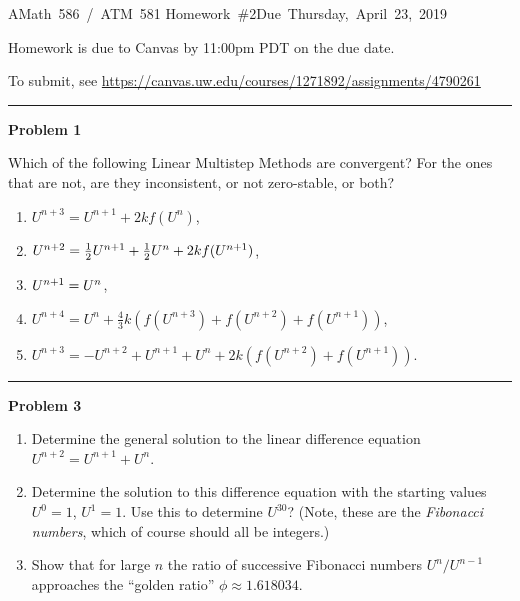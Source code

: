\documentclass[10pt]{article}
\begin{document}
\hfill\vbox{\hbox{AMath 586 / ATM 581}
\hbox{Homework \#2}\hbox{Due Thursday, April 23, 2019}}

\vskip 5pt

Homework is due to Canvas by 11:00pm PDT on the due date.

To submit, see
\url{https://canvas.uw.edu/courses/1271892/assignments/4790261}



\vskip 1cm
\hrule
{\bf Problem 1}

Which of the following Linear Multistep Methods are convergent?  For 
the ones that are not, are they inconsistent, or not zero-stable, or both?
 \begin{enumerate}
 \item $U^{n+3} = U^{n+1} + 2kf(U^n)$,
 \item $U^{n+2} = \frac{1}{2} U^{n+1} + \frac{1}{2} U^{n} + 2kf(U^{n+1})$,
 \item $U^{n+1} = U^n$, 
 \item $U^{n+4} = U^{n} + \frac 4 3 k(f(U^{n+3})+f(U^{n+2})+f(U^{n+1}))$,
 \item $U^{n+3} = -U^{n+2} + U^{n+1} +U^{n}+2k(f(U^{n+2})+f(U^{n+1}))$.
 \end{enumerate}






\vskip 1cm
\hrule
{\bf Problem 3}

\begin{enumerate}
\item Determine the general solution to the linear difference equation
$U^{n+2} = U^{n+1} + U^n$.

\item Determine the solution to this difference equation with the starting
values $U^0=1$, $U^1=1$.  Use this to determine $U^{30}$?  
(Note, these are the {\em Fibonacci numbers}, which of course should all be
integers.)

\item Show that for large $n$ the ratio of successive Fibonacci numbers
$U^n/U^{n-1}$ approaches the ``golden ratio'' $\phi \approx 1.618034$.
\end{enumerate} 
\end{document}
